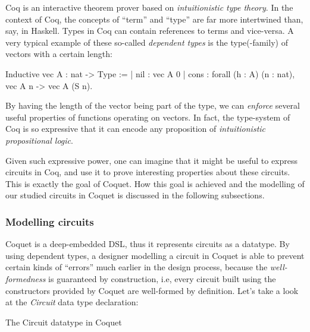 \documentclass[a4paper]{article}
\begin{document}
            Coq is an interactive theorem prover based on \emph{intuitionistic type theory}. In the
            context of Coq, the concepts of ``term'' and ``type'' are far more intertwined than,
            say, in Haskell. Types in Coq can contain references to terms and vice-versa. A very
            typical example of these so-called \emph{dependent types} is the type(-family) of
            vectors with a certain length:

            \begin{coqcode}
        Inductive vec A : nat -> Type :=
            | nil  : vec A 0
            | cons : forall (h : A) (n : nat),  vec A n -> vec A (S n).
            \end{coqcode}

            By having the length of the vector being part of the type, we can \emph{enforce} several
            useful properties of functions operating on vectors. In fact, the type-system of Coq is
            so expressive that it can encode any proposition of \emph{intuitionistic propositional
                logic}.

            Given such expressive power, one can imagine that it might be useful to express circuits
            in Coq, and use it to prove interesting properties about these circuits. This is exactly
            the goal of Coquet. How this goal is achieved and the modelling of our studied circuits
            in Coquet is discussed in the following subsections.

            \subsubsection{Modelling circuits}
            \label{subsubsec:coquet-modelling}
                Coquet is a deep-embedded DSL, thus it represents circuits as a datatype. By using
                dependent types, a designer modelling a circuit in Coquet is able to prevent certain
                kinds of ``errors'' much earlier in the design process, because the
                \emph{well-formedness} is guaranteed by construction, i.e, every circuit built using
                the constructors provided by Coquet are well-formed by definition. Let's take a look
                at the \emph{Circuit} data type declaration:

                \begin{listing}[h!]
                    \caption{The Circuit datatype in Coquet
                        \label{lst:coquet-circuit-type}}
                \end{listing}
\end{document}
